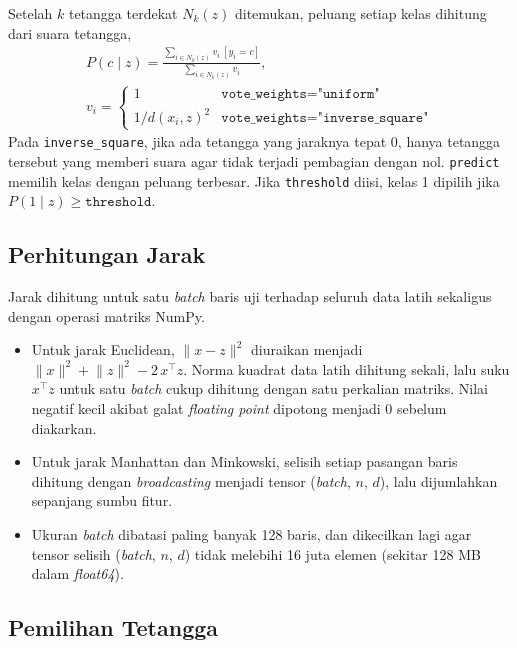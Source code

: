 Setelah $k$ tetangga terdekat $N_k(z)$ ditemukan, peluang setiap kelas dihitung
dari suara tetangga,
\begin{equation}
	\begin{gathered}
	P(c\mid z)=\frac{\sum_{i\in N_k(z)}v_i\,[y_i=c]}{\sum_{i\in N_k(z)}v_i},\\
	v_i=\begin{cases}1 & \texttt{vote\_weights="uniform"}\\ 1/d(x_i,z)^2 & \texttt{vote\_weights="inverse\_square"}\end{cases}
	\end{gathered}
\end{equation}
Pada \texttt{inverse\_square}, jika ada tetangga yang jaraknya tepat 0, hanya
tetangga tersebut yang memberi suara agar tidak terjadi pembagian dengan nol.
\texttt{predict} memilih kelas dengan peluang terbesar. Jika \texttt{threshold}
diisi, kelas 1 dipilih jika $P(1\mid z)\ge\texttt{threshold}$.

\subsection{Perhitungan Jarak}

Jarak dihitung untuk satu \textit{batch} baris uji terhadap seluruh data latih
sekaligus dengan operasi matriks NumPy.
\begin{itemize}
	\item Untuk jarak Euclidean, $\lVert x-z\rVert^2$ diuraikan menjadi
	$\lVert x\rVert^2+\lVert z\rVert^2-2\,x^\top z$. Norma kuadrat data latih
	dihitung sekali, lalu suku $x^\top z$ untuk satu \textit{batch} cukup dihitung
	dengan satu perkalian matriks. Nilai negatif kecil akibat galat
	\textit{floating point} dipotong menjadi 0 sebelum diakarkan.
	\item Untuk jarak Manhattan dan Minkowski, selisih setiap pasangan baris
	dihitung dengan \textit{broadcasting} menjadi tensor
	(\textit{batch}, $n$, $d$), lalu dijumlahkan sepanjang sumbu fitur.
	\item Ukuran \textit{batch} dibatasi paling banyak 128 baris, dan dikecilkan
	lagi agar tensor selisih (\textit{batch}, $n$, $d$) tidak melebihi 16 juta
	elemen (sekitar 128 MB dalam \textit{float64}).
\end{itemize}

\subsection{Pemilihan Tetangga}

